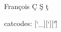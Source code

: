 \documentclass{article}
\begin{document}
Fran\c cois \c C \c{S} \c{t}

catcodes: [\the\catcode`\_][\the\catcode`\:][\the\catcode`\~]
\end{document}
